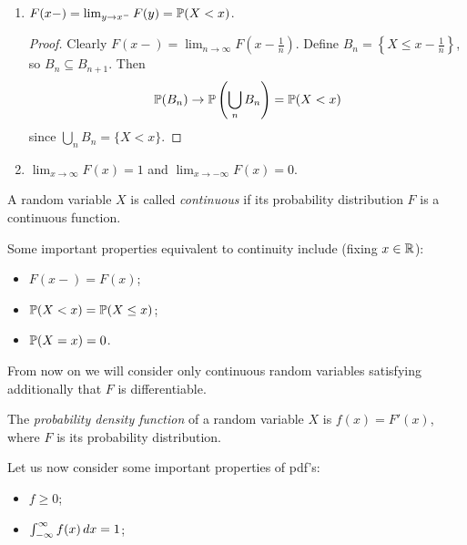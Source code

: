 \documentclass{../template/note}
\begin{document}
    \begin{enumerate}[resume,label=\protect\circled{\arabic*}]
        \item \(F(x-) = \lim_{y \to x^-} F(y) = \mathbb P(X < x)\).
        \begin{proof}
            Clearly \(F(x-) = \lim_{n \to \infty} F\left(x - \frac 1 n \right)\). Define \(B_n = \left\{X \leq x - \frac 1 n \right\}\), so \(B_n \subseteq B_{n+1}\). Then
            \begin{align*}
                \mathbb P(B_n) \to \mathbb P\left(\bigcup_n B_n\right) = \mathbb P(X < x)
            \end{align*}
            since \(\bigcup_n B_n = \{X < x\}\).            
        \end{proof}

        \item \(\lim_{x \to \infty} F(x) = 1\) and \(\lim_{x \to -\infty} F(x) = 0\).
    \end{enumerate}
    
    \begin{definition}
        A random variable \(X\) is called \emph{continuous} if its probability distribution \(F\) is a continuous function.
    \end{definition}
    
    Some important properties equivalent to continuity include (fixing \(x \in \mathbb R\)):
    \begin{itemize}
        \item \(F(x-) = F(x)\);
        \item \(\mathbb P(X < x) = \mathbb P(X \leq x)\);
        \item \(\mathbb P(X = x) = 0\).
    \end{itemize}
    
    From now on we will consider only continuous random variables satisfying additionally that \(F\) is differentiable.

    \begin{definition}
        The \emph{probability density function} of a random variable \(X\) is \(f(x) = F'(x)\), where \(F\) is its probability distribution.
    \end{definition}
    
    Let us now consider some important properties of pdf's:
    \begin{itemize}
        \item \(f \geq 0\);
        \item \(\int_{-\infty}^\infty f(x) \,d{x} = 1\);
    \end{itemize}
    
\end{document}
